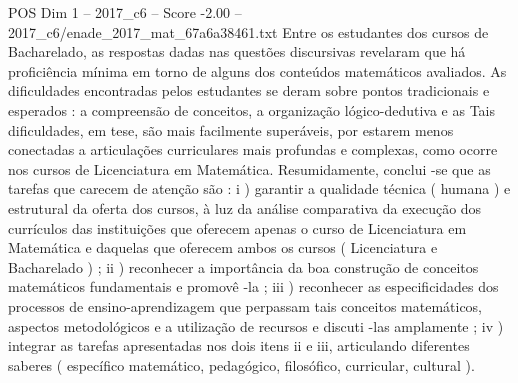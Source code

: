 \begin{textsample}{POS Dim 1 – 2017\_c6 – Score -2.00 – 2017\_c6/enade\_2017\_mat\_67a6a38461.txt}
Entre os estudantes dos cursos de Bacharelado, as respostas dadas nas questões discursivas revelaram que há proficiência mínima em torno de alguns dos conteúdos matemáticos avaliados.
As dificuldades encontradas pelos estudantes se deram sobre pontos tradicionais e esperados : a compreensão de conceitos, a organização lógico-dedutiva e as Tais dificuldades, em tese, são mais facilmente superáveis, por estarem menos conectadas a articulações curriculares mais profundas e complexas, como ocorre nos cursos de Licenciatura em Matemática.
Resumidamente, conclui -se que as tarefas que carecem de atenção são : i ) garantir a qualidade técnica ( humana ) e estrutural da oferta dos cursos, à luz da análise comparativa da execução dos currículos das instituições que oferecem apenas o curso de Licenciatura em Matemática e daquelas que oferecem ambos os cursos ( Licenciatura e Bacharelado ) ; ii ) reconhecer a importância da boa construção de conceitos matemáticos fundamentais e promovê -la ; iii ) reconhecer as especificidades dos processos de ensino-aprendizagem que perpassam tais conceitos matemáticos, aspectos metodológicos e a utilização de recursos e discuti -las amplamente ; iv ) integrar as tarefas apresentadas nos dois itens ii e iii, articulando diferentes saberes ( específico matemático, pedagógico, filosófico, curricular, cultural ).

\end{textsample}
